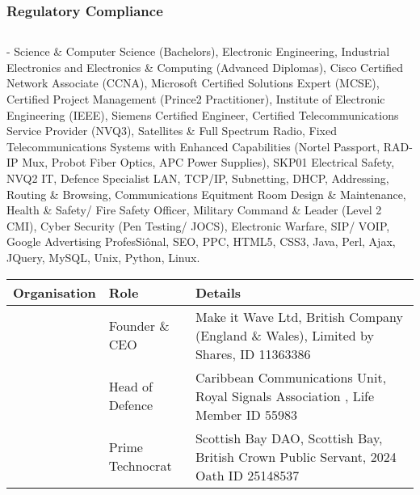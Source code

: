 \documentclass[letterpaper,10pt,english]{sphinxmanual}
\begin{document}
\subsubsection{Regulatory Compliance}
\label{\detokenize{legalandaccounting:regulatory-compliance}}

\subsection{}
\label{\detokenize{index:document-author-s}}
 - Science \& Computer Science (Bachelors), Electronic Engineering, Industrial Electronics and Electronics \& Computing (Advanced Diplomas), Cisco Certified Network Associate (CCNA), Microsoft Certified Solutions Expert (MCSE), Certified Project Management (Prince2 Practitioner), Institute of Electronic Engineering (IEEE), Siemens Certified Engineer, Certified Telecommunications Service Provider (NVQ3), Satellites \& Full Spectrum Radio, Fixed Telecommunications Systems with Enhanced Capabilities (Nortel Passport, RAD-IP Mux, Probot Fiber Optics, APC Power Supplies), SKP01 Electrical Safety, NVQ2 IT, Defence Specialist LAN, TCP/IP, Subnetting, DHCP, Addressing, Routing \& Browsing, Communications Equitment Room Design \& Maintenance, Health \& Safety/ Fire Safety Officer, Military Command \& Leader (Level 2 CMI),  Cyber Security (Pen Testing/ JOCS), Electronic Warfare, SIP/ VOIP, Google Advertising ProfesSiônal, SEO, PPC, HTML5, CSS3, Java, Perl, Ajax, JQuery, MySQL, Unix, Python, Linux.


\begin{savenotes}\sphinxattablestart
\centering
\begin{tabulary}{\linewidth}[t]{|T|T|T|}
\hline
\sphinxstyletheadfamily 
Organisation
&\sphinxstyletheadfamily 
Role
&\sphinxstyletheadfamily 
Details
\\
\hline
\noindent{}
&
Founder \& CEO
&
Make it Wave Ltd, British Company (England \& Wales), Limited by Shares, ID 11363386
\\
\hline
\noindent{}
&
Head of Defence
&
Caribbean Communications Unit, Royal Signals Association , Life Member ID 55983
\\
\hline
\noindent{}
&
Prime Technocrat
&
Scottish Bay DAO, Scottish Bay, British Crown Public Servant, 2024 Oath ID 25148537
\\
\hline
\end{tabulary}
\par
\sphinxattableend\end{savenotes}
\end{document}

